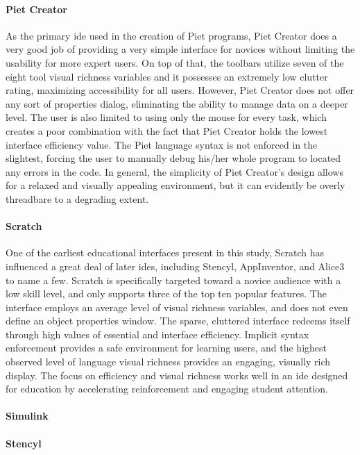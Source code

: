 \paragraph{Piet Creator} As the primary \ac{ide} used in the creation of
Piet programs, Piet Creator does a very good job of providing a very simple
interface for novices without limiting the usability for more expert users.
On top of that, the toolbars utilize seven of the eight tool visual
richness variables and it possesses an extremely low clutter rating,
maximizing accessibility for all users.  However, Piet Creator does not
offer any sort of properties dialog, eliminating the ability to manage data
on a deeper level. The user is also limited to using only the mouse for
every task, which creates a poor combination with the fact that Piet
Creator holds the lowest interface efficiency value. The Piet language
syntax is not enforced in the slightest, forcing the user to manually debug
his/her whole program to located any errors in the code. In general, the
simplicity of Piet Creator's design allows for a relaxed and visually
appealing environment, but it can evidently be overly threadbare to a
degrading extent.

\paragraph{Scratch} One of the earliest educational interfaces present in
this study, Scratch has influenced a great deal of later \acp{ide},
including Stencyl, AppInventor, and Alice3 to name a few. Scratch is
specifically targeted toward a novice audience with a low skill level, and
only supports three of the top ten popular features. The interface employs
an average level of visual richness variables, and does not even define an
object properties window. The sparse, cluttered interface redeems itself
through high values of essential and interface efficiency. Implicit syntax
enforcement provides a safe environment for learning users, and the highest
observed level of language visual richness provides an engaging, visually
rich display. The focus on efficiency and visual richness works well in an
\ac{ide} designed for education by accelerating reinforcement and engaging
student attention.

\paragraph{Simulink}

\paragraph{Stencyl}

